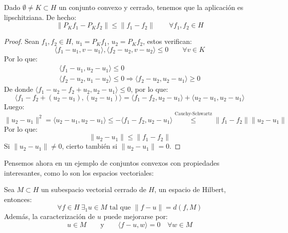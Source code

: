 \begin{prop}
    Dado $\emptyset  \neq K\subset H$ un conjunto convexo y cerrado, tenemos que la aplicación
    es lipschitziana. De hecho:
    \begin{equation*}
        \|P_Kf_1 - P_Kf_2\| \leq \|f_1 - f_2\| \qquad \forall f_1,f_2\in H
    \end{equation*}
    \begin{proof}
        Sean $f_1, f_2\in H$, $u_1 = P_Kf_1$, $u_2=P_Kf_2$, estos verifican:
        \begin{equation*}
            \langle f_1-u_1, v-u_1 \rangle , \langle f_2-u_2,v-u_2 \rangle  \leq 0 \qquad \forall v\in K
        \end{equation*}
        Por lo que:
        \begin{gather*}
            \langle f_1 - u_1, u_2 - u_1 \rangle  \leq 0 \\
            \langle f_2 - u_2, u_1 - u_2 \rangle \leq 0 \Longrightarrow \langle f_2 - u_2, u_2 - u_1 \rangle \geq 0
        \end{gather*}
        De donde $\langle f_1 - u_2 - f_2 + u_2, u_2 - u_1 \rangle \leq 0$, por lo que:
        \begin{equation*}
            \langle f_1 - f_2 + (u_2 - u_1), (u_2 - u_1) \rangle  = \langle f_1 - f_2, u_2 - u_1 \rangle  + \langle u_2 - u_1, u_2 - u_1 \rangle 
        \end{equation*}
        Luego:
        \begin{equation*}
            \|u_2 - u_1\|^2 = \langle u_2 - u_1, u_2 - u_1 \rangle  \leq - \langle f_1 - f_2, u_2 - u_1 \rangle \stackrel{\text{Cauchy-Schwartz}}{\leq} \|f_1 - f_2\| \|u_2 - u_1\|
        \end{equation*}
        Por lo que:
        \begin{equation*}
            \|u_2 - u_1\| \leq \|f_1 - f_2\|
        \end{equation*}
        Si $\|u_2 - u_1\| \neq 0$, cierto también si $\|u_2 - u_1\| = 0$.
    \end{proof}
\end{prop}

\noindent
Pensemos ahora en un ejemplo de conjuntos convexos con propiedades interesantes, como lo son los espacios vectoriales:

\begin{coro}
    Sea $M\subset H$ un subespacio vectorial cerrado de $H$, un espacio de Hilbert, entonces:
    \begin{equation*}
        \forall f\in H~\exists _1 u \in M \text{\ tal que\ } \|f-u\| = d(f,M)
    \end{equation*}
    Además, la caracterización de $u$ puede mejorarse por:
    \begin{equation*}
        u\in M \qquad \text{y} \qquad \langle f-u,w \rangle  = 0 \quad \forall w\in M
    \end{equation*}
\end{coro}

